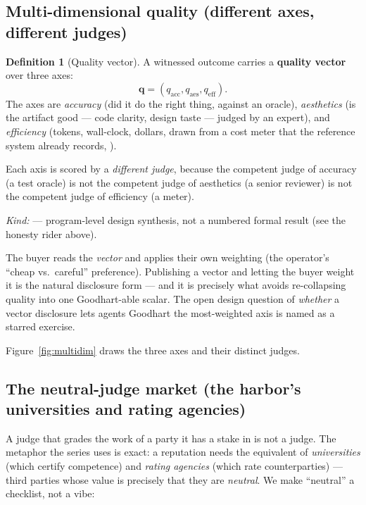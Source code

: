 \documentclass[11pt,a4paper]{article}
\theoremstyle{definition}
\newtheorem{definition}{Definition}[section]
\begin{document}
\subsection{Multi-dimensional quality (different axes, different judges)}

\begin{definition}[Quality vector]\label{def:qvec}
\setlength{\parskip}{4pt plus 1pt}
A witnessed outcome carries a \textbf{quality vector} over three axes:
\[
\mathbf{q} = (q_{\text{acc}}, q_{\text{aes}}, q_{\text{eff}}).
\]
The axes are
\emph{accuracy} (did it do the right thing, against an oracle), \emph{aesthetics}
(is the artifact good --- code clarity, design taste --- judged by an expert), and
\emph{efficiency} (tokens, wall-clock, dollars, drawn from a cost meter that the
reference system already records, \BUILT). 

Each axis is scored by a \emph{different
judge}, because the competent judge of accuracy (a test oracle) is not the
competent judge of aesthetics (a senior reviewer) is not the competent judge of
efficiency (a meter). 

\emph{Kind:} \DesignInvariantKind{} --- program-level design
synthesis, not a numbered formal result (see the honesty rider above).
\end{definition}

\noindent The buyer reads the \emph{vector} and applies their own weighting (the
operator's ``cheap vs.\ careful'' preference). Publishing a vector and letting the
buyer weight it is the natural disclosure form --- and it is precisely what avoids
re-collapsing quality into one Goodhart-able scalar. The open design question of
\emph{whether} a vector disclosure lets agents Goodhart the most-weighted axis is
named as a starred exercise.

Figure~\ref{fig:multidim} draws the three axes and their distinct judges.


\subsection{The neutral-judge market (the harbor's universities and rating agencies)}

A judge that grades the work of a party it has a stake in is not a judge. The
metaphor the series uses is exact: a reputation needs the equivalent of
\emph{universities} (which certify competence) and \emph{rating agencies} (which
rate counterparties) --- third parties whose value is precisely that they are
\emph{neutral}. We make ``neutral'' a checklist, not a vibe:
\end{document}

